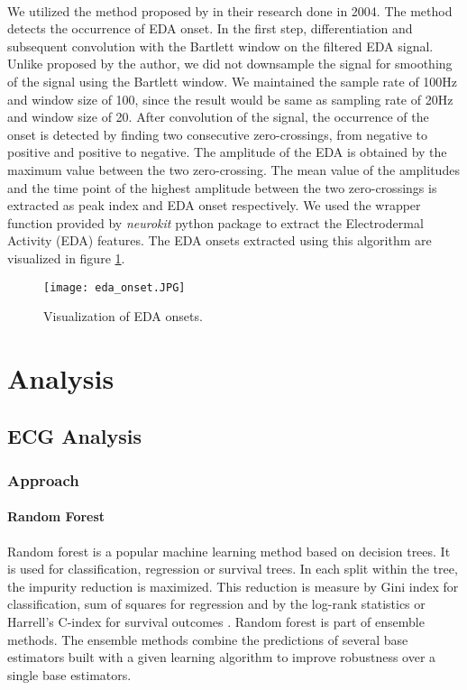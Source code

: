 \paragraph{} We utilized the method proposed by \citeauthor{kim_emotion_2004} in their research done in 2004. The method detects the occurrence of EDA onset. In the first step, differentiation and subsequent convolution with the Bartlett window on the filtered EDA signal. Unlike proposed by the author, we did not downsample the signal for smoothing of the signal using the Bartlett window. We maintained the sample rate of 100Hz and window size of 100, since the result would be same as sampling rate of 20Hz and window size of 20. After convolution of the signal, the occurrence of the onset is detected by finding two consecutive zero-crossings, from negative to positive and positive to negative. The amplitude of the EDA is obtained by the maximum value between the two zero-crossing. The mean value of the amplitudes and the time point of the highest amplitude between the two zero-crossings is extracted as peak index and EDA onset respectively. We used the wrapper function provided by \textit{neurokit} python package to extract the Electrodermal Activity (EDA) features. The EDA onsets extracted using this algorithm are visualized in figure \ref{fig:eda_onsets}.

\begin{figure}
    \centering
    \texttt{[image: eda\_onset.JPG]}
    \caption{Visualization of EDA onsets.}
    \label{fig:eda_onsets}
\end{figure}

\section{Analysis}
\subsection{ECG Analysis}
\subsubsection{Approach}
\paragraph{Random Forest} Random forest \cite{breiman2001random} is a popular machine learning method based on decision trees. It is used for classification, regression or survival trees. In each split within the tree, the impurity reduction is maximized. This reduction is measure by Gini index for classification, sum of squares for regression and by the log-rank statistics or Harrell's C-index for survival outcomes \cite{wright_splitting_2019}. Random forest is part of ensemble methods. The ensemble methods combine the predictions of several base estimators built with a given learning algorithm to improve robustness over a single base estimators.
